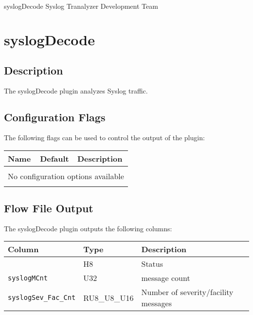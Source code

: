 \documentclass[documentation]{subfiles}
\begin{document}
\trantitle
    {syslogDecode} %
    {Syslog} %
    {Tranalyzer Development Team} %

\section{syslogDecode}\label{s:syslogDecode}

\subsection{Description}
The syslogDecode plugin analyzes Syslog traffic.

\subsection{Configuration Flags}
The following flags can be used to control the output of the plugin:
\begin{longtable}{lcl}
    \toprule
    {\bf Name} & {\bf Default} & {\bf Description} \\
    \midrule\endhead%
    \\\multicolumn{3}{c}{No configuration options available}\\\\
    \bottomrule
\end{longtable}

\subsection{Flow File Output}
The syslogDecode plugin outputs the following columns:
\begin{longtable}{lll}
    \toprule
    {\bf Column} & {\bf Type} & {\bf Description}\\
    \midrule\endhead%
    {\tt \nameref{syslogStat}} & H8           & Status \\
    {\tt syslogMCnt}           & U32          & message count \\
    {\tt syslogSev\_Fac\_Cnt}  & RU8\_U8\_U16 & Number of severity/facility messages \\
    \bottomrule
\end{longtable}
\end{document}
